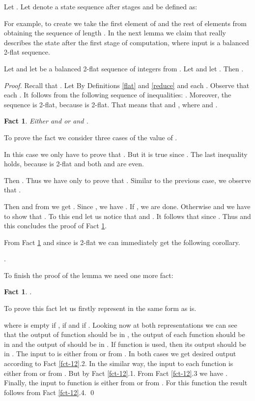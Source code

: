 \documentclass{llncs}
\newtheorem{fact}[theorem]{Fact}
\begin{document}
\begin{definition}\label{def-X}
Let . Let  denote a state sequence after  stages and
be defined as:

\end{definition}

For example, to create  we take the first element of  and
the rest of elements from  obtaining the sequence  of length . In the
next lemma we claim that  really describes the state after the
first stage of computation, where input is a balanced 2-flat sequence.

\begin{lemma}\label{l6}
Let  and let  be a balanced
2-flat sequence of integers from . Let  and let . Then .
\end{lemma}
\begin{proof}
Recall that . Let  By
Definitions \ref{flat} and \ref{reduce}  and each
. Observe that each
. It follows
from the following sequence of inequalities: . Moreover, the sequence  is 2-flat, because 
 is 2-flat. That means that  and , 
where  and .
\begin{fact} \label{fct-13}
Either  and  or  
and .
\end{fact}
To prove the fact we consider three cases of the value of .

 In this case we only have to prove that 
. But it is true since . The last inequality holds, because 
 is 2-flat and both  and  are even.

 Then . Thus we have 
only to prove that . Similar to the previous case, we 
observe that .

 Then 
and from  we get . Since , we have . If , we are done. Otherwise  and we have to show that
. To this end let us notice that  and . It follows that  since . Thus  and this
concludes the proof of Fact \ref{fct-13}.

From Fact \ref{fct-13} and since  is 2-flat we can immediately 
get the following corollary.
\begin{corollary}
.
\end{corollary}
To finish the proof of the lemma we need one more fact:
\begin{fact}
.
\end{fact}
To prove this fact let us firstly represent  in the same form as 
 is.

where  is empty if ,  if 
 and  if 
. Looking now at both representations we can see 
that the output of  function should be in , the output of each 
 function should be in  and the output of  should be 
in . If  function is used, then its output should 
be in . The input to  is either from  or from . In 
both cases we get desired output according to Fact \ref{fct-12}.2. In the 
similar way, the input to each  function is either from  or from . But  by Fact \ref{fct-12}.1. From Fact \ref{fct-12}.3 we have 
. Finally, the input to  function is 
either from  or from . For this 
function the result follows from Fact \ref{fct-12}.4. \qed
\end{proof}
\end{document}
